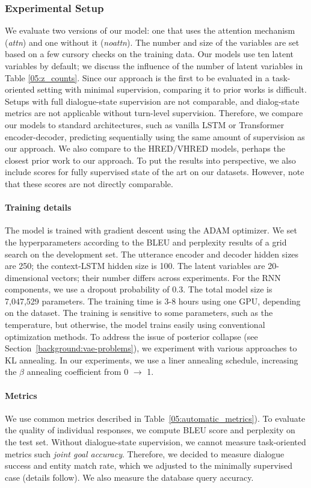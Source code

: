 \subsubsection{Experimental Setup}
\label{05:sec:expe_setup}
We evaluate two versions of our model: one that uses the attention mechanism (\emph{attn}) and one without it (\emph{noattn}). The number and size of the variables are set based on a few cursory checks on the training data. Our models use ten latent variables by default; we discuss the influence of the number of latent variables in Table \ref{05:z_counts}.
Since our approach is the first to be evaluated in a task-oriented setting with minimal supervision, comparing it to prior works is difficult. Setups with full dialogue-state supervision are not comparable, and dialog-state metrics are not applicable without turn-level supervision. Therefore, we compare our models to standard architectures, such as vanilla LSTM or Transformer encoder-decoder, predicting sequentially using the same amount of supervision as our approach. We also compare to the HRED/VHRED models, perhaps the closest prior work to our approach. To put the results into perspective, we also include scores for fully supervised state of the art on our datasets.
However, note that these scores are not directly comparable.

\paragraph{Training details}
The model is trained with gradient descent using the ADAM optimizer.
We set the hyperparameters according to the BLEU and perplexity results of a grid search on the development set.
The utterance encoder and decoder hidden sizes are 250; the context-LSTM hidden size is 100.
The latent variables are 20-dimensional vectors; their number differs across experiments.
For the RNN components, we use a dropout probability of $0.3$.
The total model size is 7,047,529 parameters.
The training time is 3-8 hours using one GPU, depending on the dataset.
The training is sensitive to some parameters, such as the  temperature, but otherwise, the model trains easily using conventional optimization methods.
To address the issue of posterior collapse (see Section~\ref{background:vae-problems}), we experiment with various approaches to KL annealing.
In our experiments, we use a liner annealing schedule, increasing the $\beta$ annealing coefficient from 0 $\rightarrow$ 1.
\paragraph{Metrics}
We use common metrics described in Table~\ref{05:automatic_metrics}).
To evaluate the quality of individual responses, we compute BLEU score and perplexity on the test set.
Without dialogue-state supervision, we cannot measure task-oriented metrics such \emph{joint goal accuracy}.
Therefore, we decided to measure dialogue success and entity match rate, which we adjusted to the minimally supervised case (details follow).
We also measure the database query accuracy.



